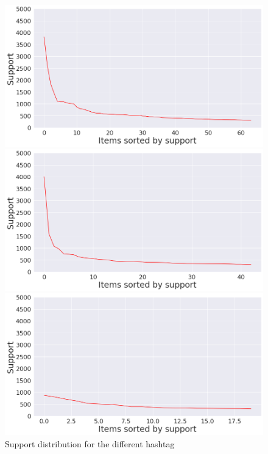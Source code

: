 \documentclass[12pt,%
               a4paper,%
               oneside,openany,%
               titlepage,%
               headinclude,footinclude,%
               BCOR5mm,%
               cleardoublepage=empty,%
               tablecaptionabove,%
               floatperchapter,
               ]{scrreprt}                 %
\begin{document}
\begin{figure}[ht]
\begin{minipage}[b]{0.5\linewidth}
    \vspace{4ex}
  \end{minipage}
    \begin{minipage}[b]{0.5\linewidth}
    \centering
    \includegraphics[width=.9\linewidth]{Figures/Support_distrubution_pfizer.png}
    \vspace{4ex}
  \end{minipage}
  \begin{minipage}[b]{0.5\linewidth}
    \centering
    \includegraphics[width=.9\linewidth]{Figures/Support_distrubution_Vaccine.png}
    \vspace{4ex}
  \end{minipage}%
     \begin{minipage}[b]{0.5\linewidth}
    \centering
    \includegraphics[width=.9\linewidth]{Figures/Support_distrubution_Freedom.png}
    \vspace{4ex}
  \end{minipage}

\caption{Support distribution for the different hashtag}
\label{Support distribution_ALL}
\end{figure}
\end{document}
